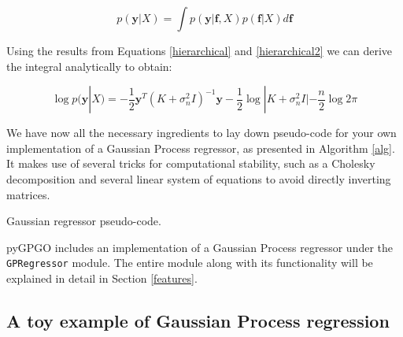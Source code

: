 \documentclass[10pt,a4paper,twoside]{book}
\begin{document}
\begin{equation}
p(\boldsymbol{y}|X) = \int p(\boldsymbol{y}|\boldsymbol{f}, X)p(\boldsymbol{f}|X) d\boldsymbol{f}
\end{equation}

Using the results from Equations \ref{hierarchical} and \ref{hierarchical2} we can derive the integral analytically to obtain:

\begin{equation}
\log p(\boldsymbol{y}|X) = - \dfrac{1}{2}\boldsymbol{y}^T(K + \sigma^2_n I)^{-1}\boldsymbol{y} - \dfrac{1}{2}\log |K + \sigma^2_n I| - \dfrac{n}{2}\log 2\pi
\end{equation}

We have now all the necessary ingredients to lay down pseudo-code for your own implementation of a Gaussian Process regressor, as presented in Algorithm \ref{alg}. It makes use of several tricks for computational stability, such as a Cholesky decomposition and several linear system of equations to avoid directly inverting matrices.\\

\begin{algorithm}
	\caption{Gaussian regressor pseudo-code.}
		\label{alg}
		\begin{algorithmic}[1]
			\EndFunction
		\end{algorithmic}
\end{algorithm}

pyGPGO includes an implementation of a Gaussian Process regressor under the \texttt{GPRegressor} module. The entire module along with its functionality will be explained in detail in Section \ref{features}.

\subsection{A toy example of Gaussian Process regression}
\end{document}
